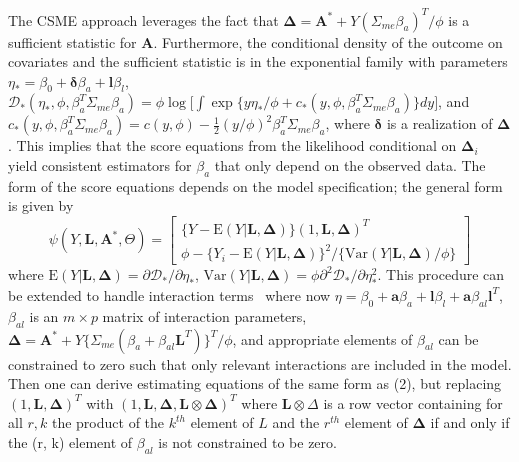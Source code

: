 \documentclass[useAMS,usenatbib,referee]{biom}
\begin{document}
The CSME approach leverages the fact that $\bm{\Delta} = \bm{A}^{*} + Y(\Sigma_{me}\beta_{a})^{T}/\phi$ is a sufficient statistic for $\bm{A}$. Furthermore, the conditional density of the outcome on covariates and the sufficient statistic is in the exponential family with parameters $\eta_{*} = \beta_{0} + \bm{\delta}\beta_{a} + \bm{l}\beta_{l}$, $\mathcal{D}_{*}(\eta_{*}, \phi, \beta_{a}^{T}\Sigma_{me}\beta_{a}) = \phi \log \bigg[ \int \exp \{ y\eta_{*}/\phi + c_{*}(y, \phi,  \beta_{a}^{T}\Sigma_{me}\beta_{a}) \} dy \bigg]$, and $c_{*}(y, \phi, \beta_{a}^{T}\Sigma_{me}\beta_{a}) = c(y, \phi) - \frac{1}{2}(y/\phi)^{2}\beta_{a}^{T}\Sigma_{me}\beta_{a}$, where $\bm{\delta}$ is a realization of $\bm{\Delta}$. This implies that the score equations from the likelihood conditional on $\bm{\Delta}_{i}$ yield consistent estimators for $\beta_{a}$ that only depend on the observed data. The form of the score equations depends on the model specification; the general form is given by
\begin{equation}
    \psi(Y, \bm{L}, \bm{A}^{*}, \Theta) =
    \begin{bmatrix}
       \{ Y - \text{E}(Y | \bm{L}, \bm{\Delta}) \} (1, \bm{L}, \bm{\Delta})^{T} \\
        \phi - \{ Y_{i} - \text{E}(Y | \bm{L}, \bm{\Delta}) \}^{2} / \{ \text{Var}(Y | \bm{L}, \bm{\Delta}) / \phi \}
    \end{bmatrix}
\end{equation}
where $\text{E}(Y | \bm{L}, \bm{\Delta}) = \partial \mathcal{D}_{*} / \partial \eta_{*}$, $\text{Var}(Y | \bm{L}, \bm{\Delta}) = \phi \partial^{2} \mathcal{D}_{*} / \partial \eta^{2}_{*}$. This procedure can be extended to handle interaction terms~\citep{dagalp2001} where now $\eta = \beta_{0} + \bm{a}\beta_{a} + \bm{l}\beta_{l} + \bm{a}\beta_{al}\bm{l}^{T}$, $\beta_{al}$ is an $m \times p$ matrix of interaction parameters, $\bm{\Delta} = \bm{A}^{*} + Y\{ \Sigma_{me}(\beta_{a} + \beta_{al}\bm{L}^{T}) \}^{T}/\phi$, and appropriate elements of $\beta_{al}$ can be constrained to zero such that only relevant interactions are included in the model. Then one can derive estimating equations of the same form as (2), but replacing $(1, \bm{L}, \bm{\Delta})^{T}$ with $(1, \bm{L}, \bm{\Delta}, \bm{L} \otimes \bm{\Delta})^{T}$ where $\bm{L} \otimes \Delta$ is a row vector containing for all $r, k$ the product of the $k^{th}$ element of $L$ and the $r^{th}$ element of $\bm{\Delta}$ if and only if the (r, k) element of $\beta_{al}$ is not constrained to be zero.
\end{document}
